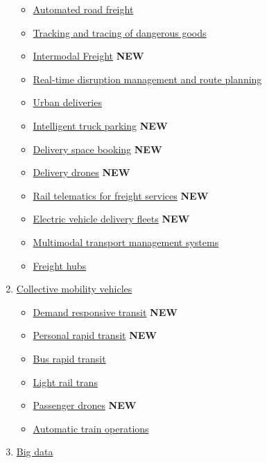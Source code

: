 \documentclass[
]{book}
\providecommand{\tightlist}{%
  \setlength{\itemsep}{0pt}\setlength{\parskip}{0pt}}
\begin{document}
\begin{enumerate}
  \begin{itemize}
  \tightlist
  \item
    \protect\hyperlink{automated_road_freight}{Automated road freight}
  \item
    \protect\hyperlink{dangerous_goods}{Tracking and tracing of dangerous goods}
  \item
    \protect\hyperlink{intermodal_freight}{Intermodal Freight} \textbf{NEW}
  \item
    \protect\hyperlink{disruption_management}{Real-time disruption management and route planning}
  \item
    \protect\hyperlink{urban_delivery}{Urban deliveries}
  \item
    \protect\hyperlink{intelligent_truck_park}{Intelligent truck parking} \textbf{NEW}
  \item
    \protect\hyperlink{space_book}{Delivery space booking} \textbf{NEW}
  \item
    \protect\hyperlink{delivery_drone}{Delivery drones} \textbf{NEW}
  \item
    \protect\hyperlink{rail_telematics_freight}{Rail telematics for freight services} \textbf{NEW}
  \item
    \protect\hyperlink{electric_delivery_fleets}{Electric vehicle delivery fleets} \textbf{NEW}
  \item
    \protect\hyperlink{mtms}{Multimodal transport management systems}
  \item
    \protect\hyperlink{freight_hubs}{Freight hubs}
  \end{itemize}
\item
  \protect\hyperlink{collective}{Collective mobility vehicles}

  \begin{itemize}
  \tightlist
  \item
    \protect\hyperlink{drt}{Demand responsive transit} \textbf{NEW}
  \item
    \protect\hyperlink{prt}{Personal rapid transit} \textbf{NEW}
  \item
    \protect\hyperlink{brt}{Bus rapid transit}
  \item
    \protect\hyperlink{lrt}{Light rail trans}
  \item
    \protect\hyperlink{passenger_drones}{Passenger drones} \textbf{NEW}
  \item
    \protect\hyperlink{automatic_train}{Automatic train operations}
  \end{itemize}
\item
  \protect\hyperlink{big}{Big data}


\end{enumerate}
\end{document}
